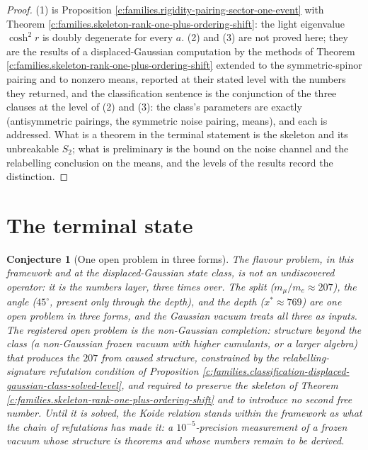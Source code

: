 \documentclass[11pt]{article}
\newtheorem{conjecture}[theorem]{Conjecture}
\theoremstyle{definition}
\theoremstyle{plain}
\begin{document}
\begin{proof}
(1) is Proposition \ref{c:families.rigidity-pairing-sector-one-event} with Theorem \ref{c:families.skeleton-rank-one-plus-ordering-shift}: the light eigenvalue $\cosh^{2}r$ is doubly degenerate for every $a$. (2) and (3) are not proved here; they are the results of a displaced-Gaussian computation by the methods of Theorem \ref{c:families.skeleton-rank-one-plus-ordering-shift} extended to the symmetric-spinor pairing and to nonzero means, reported at their stated level with the numbers they returned, and the classification sentence is the conjunction of the three clauses at the level of (2) and (3): the class's parameters are exactly (antisymmetric pairings, the symmetric noise pairing, means), and each is addressed. What is a theorem in the terminal statement is the skeleton and its unbreakable $S_{2}$; what is preliminary is the bound on the noise channel and the relabelling conclusion on the means, and the levels of the results record the distinction.

\end{proof}

\section{The terminal state}

\begin{conjecture}[One open problem in three forms]\label{c:families.one-open-problem-three-forms}
The flavour problem, in this framework and at the displaced-Gaussian state class, is not an undiscovered operator: it is the numbers layer, three times over. The split ($m_{\mu}/m_{e} \approx 207$), the angle ($45^{\circ}$, present only through the depth), and the depth ($x^{*} \approx 769$) are one open problem in three forms, and the Gaussian vacuum treats all three as inputs. The registered open problem is the non-Gaussian completion: structure beyond the class (a non-Gaussian frozen vacuum with higher cumulants, or a larger algebra) that produces the $207$ from caused structure, constrained by the relabelling-signature refutation condition of Proposition \ref{c:families.classification-displaced-gaussian-class-solved-level}, and required to preserve the skeleton of Theorem \ref{c:families.skeleton-rank-one-plus-ordering-shift} and to introduce no second free number. Until it is solved, the Koide relation stands within the framework as what the chain of refutations has made it: a $10^{-5}$-precision measurement of a frozen vacuum whose structure is theorems and whose numbers remain to be derived.
\end{conjecture}
\end{document}
